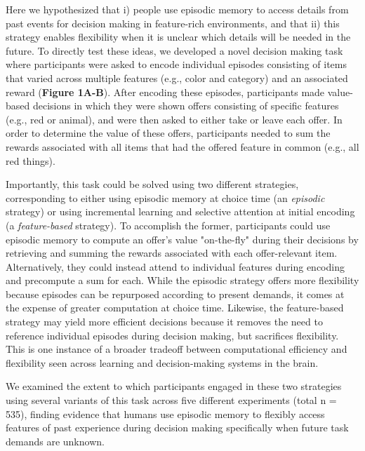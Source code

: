\documentclass[10pt,letterpaper]{article}
\begin{document}
Here we hypothesized that i) people use episodic memory to access details from past events for decision making in feature-rich environments, and that ii) this strategy enables flexibility when it is unclear which details will be needed in the future. To directly test these ideas, we developed a novel decision making task where participants were asked to encode individual episodes consisting of items that varied across multiple features (e.g., color and category) and an associated reward (\textbf{Figure 1A-B}). After encoding these episodes, participants made value-based decisions in which they were shown offers consisting of specific features (e.g., red or animal), and were then asked to either take or leave each offer. In order to determine the value of these offers, participants needed to sum the rewards associated with all items that had the offered feature in common (e.g., all red things).

Importantly, this task could be solved using two different strategies, corresponding to either using episodic memory at choice time (an \textit{episodic} strategy) or using incremental learning and selective attention at initial encoding (a \textit{feature-based} strategy). To accomplish the former, participants could use episodic memory to compute an offer's value "on-the-fly" during their decisions by retrieving and summing the rewards associated with each offer-relevant item. Alternatively, they could instead attend to individual features during encoding and precompute a sum for each. While the episodic strategy offers more flexibility because episodes can be repurposed according to present demands, it comes at the expense of greater computation at choice time. Likewise, the feature-based strategy may yield more efficient decisions because it removes the need to reference individual episodes during decision making, but sacrifices flexibility. This is one instance of a broader tradeoff between computational efficiency and flexibility seen across learning and decision-making systems in the brain\cite{dawAlgorithmicAnatomyModelbased2014, koolWhenDoesModelBased2016, shohamyHabitsReinforcementLearning2014, gershmanReinforcementLearningEpisodic2017}.

We examined the extent to which participants engaged in these two strategies using several variants of this task across five different experiments (total n = 535), finding evidence that humans use episodic memory to flexibly access features of past experience during decision making specifically when future task demands are unknown.
\end{document}
